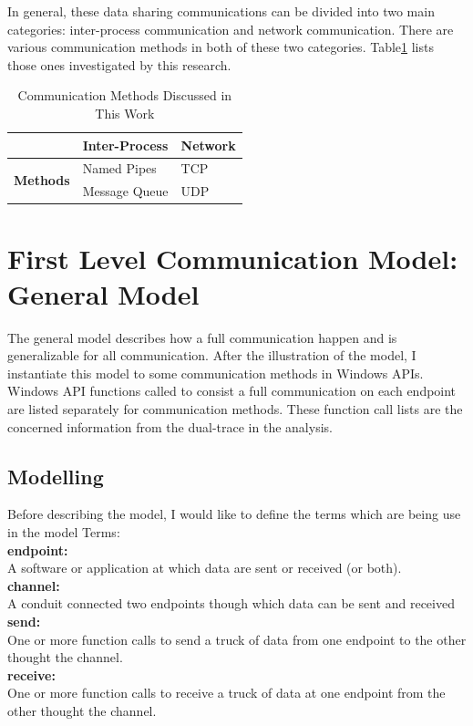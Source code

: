 In general, these data sharing communications can be divided into two main categories: inter-process communication and network communication. There are various communication methods in both of these two categories. Table\ref{methodsInCategories} lists those ones investigated by this research. 



\begin{table}[H]
\centering
\caption{Communication Methods Discussed in This Work}
\label{methodsInCategories}
\begin{tabular}{|l|l|l|}
 \hline
 &  \textbf{Inter-Process}& \textbf{Network}\\
 \hline
\multirow{2}{*}{{\textbf{Methods}}} & Named Pipes & TCP   \\
 \cline{2-3}
 & Message Queue &  UDP \\
 \hline
\end{tabular}
\end{table}


\section{First Level Communication Model: General Model}   
The general model describes how a full communication happen and is generalizable for all communication. After the illustration of the model, I instantiate this model to some communication methods in Windows APIs. Windows API functions called to consist a full communication on each endpoint are listed separately for communication methods. These function call lists are the concerned information from the dual-trace in the analysis.
\subsection{Modelling}
Before describing the model, I would like to define the terms which are being use in the model
Terms:\\
\textbf{endpoint:}\\
A software or application at which data are sent or received (or both).\\
\textbf{channel:}\\
A conduit connected two endpoints though which data can be sent and received\\
\textbf{send:}\\
One or more function calls to send a truck of data from one endpoint to the other thought the channel.\\
\textbf{receive:}\\
One or more function calls to receive a truck of data at one endpoint from the other thought the channel.\\

